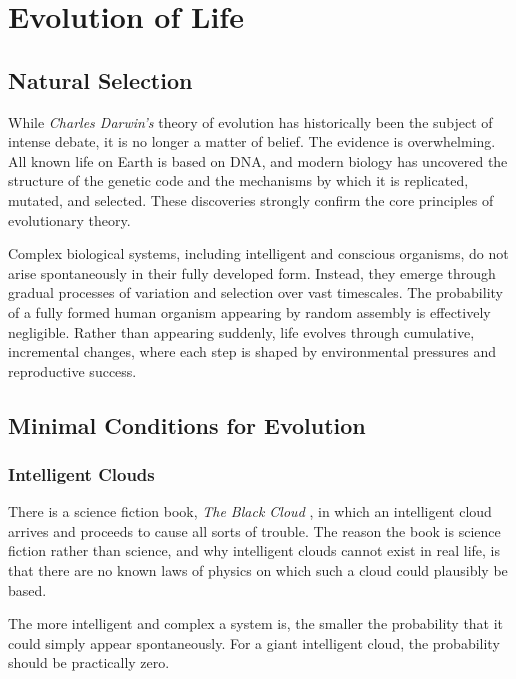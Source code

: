 \chapter{Evolution of Life}
\label{chap:evoluton-of-life}

\section{Natural Selection}

While \textit{Charles Darwin's} theory of evolution has historically been the subject of intense debate, it is no longer a matter of belief. The evidence is overwhelming.
All known life on Earth is based on DNA, and modern biology has uncovered the structure of the genetic code and the mechanisms by which it is replicated, mutated, and selected.
These discoveries strongly confirm the core principles of evolutionary theory.

Complex biological systems, including intelligent and conscious organisms, do not arise spontaneously in their fully developed form.
Instead, they emerge through gradual processes of variation and selection over vast timescales.
The probability of a fully formed human organism appearing by random assembly is effectively negligible.
Rather than appearing suddenly, life evolves through cumulative, incremental changes, where each step is shaped by environmental pressures and reproductive success.


\section{Minimal Conditions for Evolution}

\subsection*{Intelligent Clouds}

There is a science fiction book, \emph{The Black Cloud} \cite{hoyle1957blackcloud},
in which an intelligent cloud arrives and proceeds to cause all sorts
of trouble. The reason the book is science fiction rather than science,
and why intelligent clouds cannot exist in real life, is that there are
no known laws of physics on which such a cloud could plausibly be based.

The more intelligent and complex a system is, the smaller the
probability that it could simply appear spontaneously. For a giant
intelligent cloud, the probability should be practically zero.

